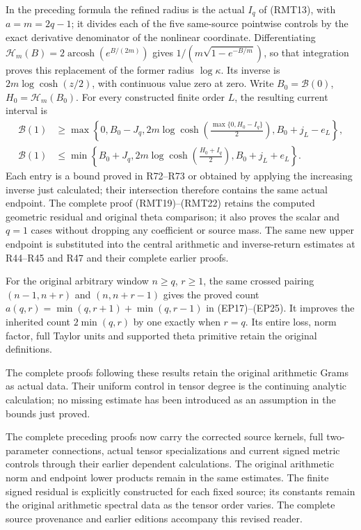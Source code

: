 In the preceding formula the refined radius is the actual
\(I_q\) of (RMT13), with \(a=m=2q-1\); it divides each
of the five same-source pointwise controls by the exact
derivative denominator of the nonlinear coordinate.
Differentiating
\(\mathscr H_m(B)=2\operatorname{arcosh}(e^{B/(2m)})\)
gives \(1/(m\sqrt{1-e^{-B/m}})\), so that integration
proves this replacement of the former radius
\(\log\kappa\).  Its inverse is
\(2m\log\cosh(z/2)\), with continuous value zero at zero.
Write \(B_0=\mathcal B(0)\), \(H_0=\mathscr H_m(B_0)\).
For every constructed finite order \(L\), the resulting
current interval is
\[
 \begin{split}
 \mathcal B(1)&\geq
 \max\left\{0,B_0-J_q,
   2m\log\cosh\left(\frac{\max\{0,H_0-I_q\}}2\right),
   B_0+j_L-e_L\right\},\\
 \mathcal B(1)&\leq
 \min\left\{B_0+J_q,
   2m\log\cosh\left(\frac{H_0+I_q}2\right),
   B_0+j_L+e_L\right\}.
 \end{split}
\]
Each entry is a bound proved in R72--R73 or obtained
by applying the increasing inverse just calculated;
their intersection therefore contains the same actual
endpoint.  The complete proof (RMT19)--(RMT22) retains
the computed geometric residual and original theta
comparison; it also proves the scalar and \(q=1\)
cases without dropping any coefficient or source mass.
The same new upper endpoint is substituted into the
central arithmetic and inverse-return estimates at
R44--R45 and R47 and their complete earlier proofs.

For the original arbitrary window $n\ge q$, $r\ge1$, the same
crossed pairing $(n-1,n+r)$ and $(n,n+r-1)$ gives the proved count
$a(q,r)=\min(q,r+1)+\min(q,r-1)$ in (EP17)--(EP25).
It improves the inherited count $2\min(q,r)$ by one exactly
when $r=q$. Its entire loss, norm factor, full Taylor units
and supported theta primitive retain the original definitions.

The complete proofs following these results retain the
original arithmetic Grams as actual data. Their uniform
control in tensor degree is the continuing analytic
calculation; no missing estimate has been introduced as
an assumption in the bounds just proved.

The complete preceding proofs now carry the corrected
source kernels, full two-parameter connections, actual tensor
specializations and current signed metric controls through their
earlier dependent calculations.  The original arithmetic norm
and endpoint lower products remain in the same estimates.
The finite signed residual is explicitly constructed for each
fixed source; its constants remain the original arithmetic
spectral data as the tensor order varies.  The complete source
provenance and earlier editions accompany this revised reader.
